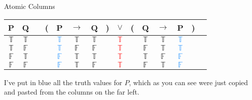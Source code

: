 \documentclass[
  ignorenonframetext,
]{beamer}
\renewcommand{\,}{\text{, }}
\def\True{\mathbb{T}}
\def\False{\mathbb{F}}
\begin{document}
\begin{frame}{Atomic Columns}
\protect\hypertarget{atomic-columns}{}

\begin{center}
\begin{tabular}{@{ }c@{ }@{ }c | c@{ }@{}c@{}@{ }c@{ }@{ }c@{ }@{ }c@{ }@{}c@{}@{ }c@{ }@{}c@{}@{ }c@{ }@{ }c@{ }@{ }c@{ }@{}c@{}@{ }c}
P & Q &  & ( & P & $\rightarrow$ & Q & ) & $\lor$ & ( & Q & $\rightarrow$ & P & ) & \\
\hline 
$\True$ & $\True$ &  &  & \textcolor{dodgerblue}{$\True$} & $\True$ & $\True$ &  & \textcolor{red}{$\True$} &  & $\True$ & $\True$ & \textcolor{dodgerblue}{$\True$} &  & \\
$\True$ & $\False$ &  &  & \textcolor{dodgerblue}{$\True$} & $\False$ & $\False$ &  & \textcolor{red}{$\True$} &  & $\False$ & $\True$ & \textcolor{dodgerblue}{$\True$} &  & \\
$\False$ & $\True$ &  &  & \textcolor{dodgerblue}{$\False$} & $\True$ & $\True$ &  & \textcolor{red}{$\True$} &  & $\True$ & $\False$ & \textcolor{dodgerblue}{$\False$} &  & \\
$\False$ & $\False$ &  &  & \textcolor{dodgerblue}{$\False$} & $\True$ & $\False$ &  & \textcolor{red}{$\True$} &  & $\False$ & $\True$ & \textcolor{dodgerblue}{$\False$} &  & \\
\end{tabular}
\bigskip
\end{center}

I've put in blue all the truth values for \(P\), which as you can see
were just copied and pasted from the columns on the far left.

\end{frame}
\end{document}
